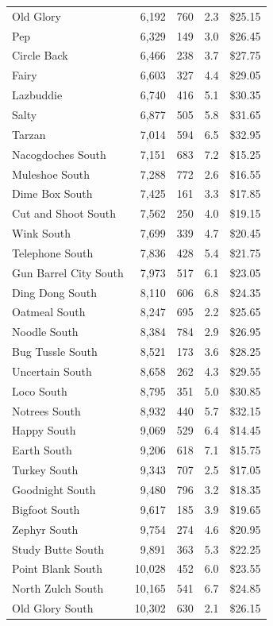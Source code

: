 \documentclass[11pt]{article}
\begin{document}
{\begin{longtable}{@{}lrrrr@{}}
Old Glory & 6,192 & 760 & 2.3 & \$25.15 \\
Pep & 6,329 & 149 & 3.0 & \$26.45 \\
Circle Back & 6,466 & 238 & 3.7 & \$27.75 \\
Fairy & 6,603 & 327 & 4.4 & \$29.05 \\
Lazbuddie & 6,740 & 416 & 5.1 & \$30.35 \\
Salty & 6,877 & 505 & 5.8 & \$31.65 \\
Tarzan & 7,014 & 594 & 6.5 & \$32.95 \\
Nacogdoches South & 7,151 & 683 & 7.2 & \$15.25 \\
Muleshoe South & 7,288 & 772 & 2.6 & \$16.55 \\
Dime Box South & 7,425 & 161 & 3.3 & \$17.85 \\
Cut and Shoot South & 7,562 & 250 & 4.0 & \$19.15 \\
Wink South & 7,699 & 339 & 4.7 & \$20.45 \\
Telephone South & 7,836 & 428 & 5.4 & \$21.75 \\
Gun Barrel City South & 7,973 & 517 & 6.1 & \$23.05 \\
Ding Dong South & 8,110 & 606 & 6.8 & \$24.35 \\
Oatmeal South & 8,247 & 695 & 2.2 & \$25.65 \\
Noodle South & 8,384 & 784 & 2.9 & \$26.95 \\
Bug Tussle South & 8,521 & 173 & 3.6 & \$28.25 \\
Uncertain South & 8,658 & 262 & 4.3 & \$29.55 \\
Loco South & 8,795 & 351 & 5.0 & \$30.85 \\
Notrees South & 8,932 & 440 & 5.7 & \$32.15 \\
Happy South & 9,069 & 529 & 6.4 & \$14.45 \\
Earth South & 9,206 & 618 & 7.1 & \$15.75 \\
Turkey South & 9,343 & 707 & 2.5 & \$17.05 \\
Goodnight South & 9,480 & 796 & 3.2 & \$18.35 \\
Bigfoot South & 9,617 & 185 & 3.9 & \$19.65 \\
Zephyr South & 9,754 & 274 & 4.6 & \$20.95 \\
Study Butte South & 9,891 & 363 & 5.3 & \$22.25 \\
Point Blank South & 10,028 & 452 & 6.0 & \$23.55 \\
North Zulch South & 10,165 & 541 & 6.7 & \$24.85 \\
Old Glory South & 10,302 & 630 & 2.1 & \$26.15 \\

\end{longtable}}
\end{document}

